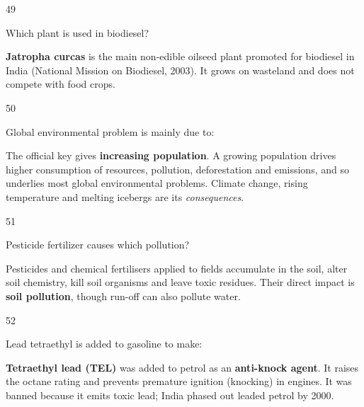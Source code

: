 \begin{question}{49}
{Which plant is used in biodiesel?\par}
\begin{explain}
\textbf{Jatropha curcas} is the main non-edible oilseed plant promoted for biodiesel in India (National Mission on Biodiesel, 2003). It grows on wasteland and does not compete with food crops.
\end{explain}
\end{question}

\begin{question}{50}
{Global environmental problem is mainly due to:\par}
\begin{explain}
The official key gives \textbf{increasing population}. A growing population drives higher consumption of resources, pollution, deforestation and emissions, and so underlies most global environmental problems. Climate change, rising temperature and melting icebergs are its \emph{consequences}.
\end{explain}
\end{question}

\begin{question}{51}
{Pesticide fertilizer causes which pollution?\par}
\begin{explain}
Pesticides and chemical fertilisers applied to fields accumulate in the soil, alter soil chemistry, kill soil organisms and leave toxic residues. Their direct impact is \textbf{soil pollution}, though run-off can also pollute water.
\end{explain}
\end{question}

\begin{question}{52}
{Lead tetraethyl is added to gasoline to make:\par}
\begin{explain}
\textbf{Tetraethyl lead (TEL)} was added to petrol as an \textbf{anti-knock agent}. It raises the octane rating and prevents premature ignition (knocking) in engines. It was banned because it emits toxic lead; India phased out leaded petrol by 2000.
\end{explain}
\end{question}

